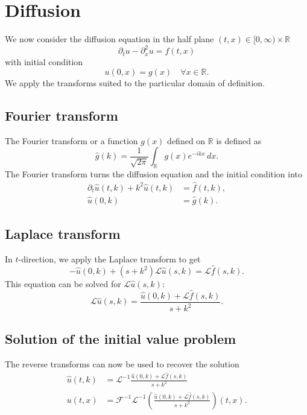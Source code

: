 %
%
%
\section{Diffusion}
We now consider the diffusion equation in the half plane
$(t,x)\in[0,\infty)\times \mathbb R$
\[
\partial_tu-\partial_x^2u=f(t,x)
\]
with initial condition
\[
u(0,x)=g(x)\quad \forall x\in\mathbb R.
\]
We apply the transforms suited to the particular domain of definition.

\subsection{Fourier transform}
The Fourier transform or a function $g(x)$ defined on $\mathbb R$ is
defined as
\[
\hat g(k)=\frac1{\sqrt{2\pi}}\int_{\mathbb R}g(x)e^{-ikx}\,dx.
\]
The Fourier transform turns the diffusion equation and the initial
condition into
\begin{align*}
\partial_t \hat u(t,k)+k^2\hat u(t,k)&=\hat f(t,k),\\
\hat u(0,k)&=\hat g(k).
\end{align*}

\subsection{Laplace transform}
In $t$-direction, we apply the Laplace transform to get
\[
-\hat u(0,k)+(s+k^2)\mathscr{L}\hat u(s,k)=\mathscr{L}\hat f(s,k).
\]
This equation can be solved for $\mathscr{L}\hat u(s,k)$:
\[
\mathscr{L}\hat u(s,k)=\frac{\hat u(0,k)+\mathscr{L}\hat f(s,k)}{s+k^2}.
\]

\subsection{Solution of the initial value problem}
The reverse transforms can now be used to recover the solution
\begin{align*}
\hat u(t,k)&=\mathscr{L}^{-1}
\frac{\hat u(0,k)+\mathscr{L}\hat f(s,k)}{s+k^2}
\\
u(t,x)&=\mathscr{F}^{-1}\mathscr{L}^{-1}
\left(\frac{\hat u(0,k)+\mathscr{L}\hat f(s,k)}{s+k^2}\right)(t,x).
\end{align*}

